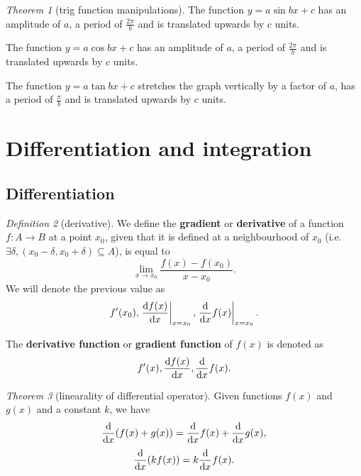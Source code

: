 \documentclass[8pt]{article}
\theoremstyle{remark}
\newtheorem{theorem}{Theorem}[section]
\newtheorem{definition}[theorem]{Definition}
\begin{document}
        \begin{theorem}[trig function manipulations]
            The function $y = a \sin bx + c$ has an amplitude of $a$, a period of $\frac{2\pi}{b}$ and is translated upwards by $c$ units.

            The function $y = a \cos bx + c$ has an amplitude of $a$, a period of $\frac{2\pi}{b}$ and is translated upwards by $c$ units.

            The function $y = a \tan bx + c$ stretches the graph vertically by a factor of $a$, has a period of $\frac{\pi}{b}$ and is translated upwards by $c$ units.
        \end{theorem}


    \section{Differentiation and integration}
        \subsection{Differentiation}

            \begin{definition}[derivative]
                We define the \textbf{gradient} or \textbf{derivative} of a function $f: A \rightarrow B$ at a point $x_0$, given that it is defined at a neighbourhood of $x_0$ (i.e. $\exists \delta, (x_0 - \delta, x_0 + \delta) \subseteq A$), is equal to
                $$
                    \lim_{x \rightarrow x_0} \frac{f(x) - f(x_0)}{x - x_0}.
                $$
                We will denote the previous value as
                $$
                    f'(x_0), \left. \frac{\mathrm{d} f(x)}{\mathrm{d} x} \right\vert _{ x = x_0 }, \left. \frac{\mathrm{d}}{\mathrm{d} x} f(x) \right\vert _{ x = x_0 }.
                $$

                The \textbf{derivative function} or \textbf{gradient function} of $f(x)$ is denoted as
                $$
                    f'(x), \frac{\mathrm{d} f(x)}{\mathrm{d} x}, \frac{\mathrm{d}}{\mathrm{d} x} f(x).
                $$
            \end{definition}

            \begin{theorem}[linearality of differential operator]
                Given functions $f(x)$ and $g(x)$ and a constant $k$, we have
                $$
                    \frac{\mathrm{d}}{\mathrm{d} x} (f(x) + g(x)) = \frac{\mathrm{d}}{\mathrm{d} x} f(x) + \frac{\mathrm{d}}{\mathrm{d} x} g(x),
                $$
                $$
                    \frac{\mathrm{d}}{\mathrm{d} x} (k f(x)) = k\frac{\mathrm{d}}{\mathrm{d} x} f(x).
                $$
            \end{theorem}
\end{document}
